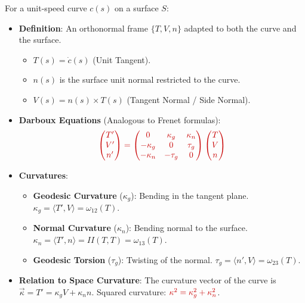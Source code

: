 \documentclass[a4paper,12pt]{article}
\newcommand{\key}[1]{\textcolor{keywordcolor}{\textbf{#1}}}
\newcommand{\formula}[1]{\textcolor{formulacolor}{#1}}
\begin{document}
For a unit-speed curve $c(s)$ on a surface $S$:
\begin{itemize}
    \item \key{Definition}: An orthonormal frame $\{T, V, n\}$ adapted to both the curve and the surface.
    \begin{itemize}
        \item $T(s) = \dot{c}(s)$ (Unit Tangent).
        \item $n(s)$ is the surface unit normal restricted to the curve.
        \item $V(s) = n(s) \times T(s)$ (Tangent Normal / Side Normal).
    \end{itemize}
    
    \item \key{Darboux Equations} (Analogous to Frenet formulas):
    \begin{equation}
        \formula{\begin{pmatrix} T' \\ V' \\ n' \end{pmatrix} = \begin{pmatrix} 0 & \kappa_g & \kappa_n \\ -\kappa_g & 0 & \tau_g \\ -\kappa_n & -\tau_g & 0 \end{pmatrix} \begin{pmatrix} T \\ V \\ n \end{pmatrix}}
    \end{equation}
    
    \item \key{Curvatures}:
    \begin{itemize}
        \item \textbf{Geodesic Curvature} ($\kappa_g$): Bending in the tangent plane. $\kappa_g = \langle T', V \rangle = \omega_{12}(T)$.
        \item \textbf{Normal Curvature} ($\kappa_n$): Bending normal to the surface. $\kappa_n = \langle T', n \rangle = II(T, T) = \omega_{13}(T)$.
        \item \textbf{Geodesic Torsion} ($\tau_g$): Twisting of the normal. $\tau_g = \langle n', V \rangle = \omega_{23}(T)$.
    \end{itemize}
    
    \item \key{Relation to Space Curvature}:
    The curvature vector of the curve is $\vec{\kappa} = T' = \kappa_g V + \kappa_n n$.
    Squared curvature: $\formula{\kappa^2 = \kappa_g^2 + \kappa_n^2}$.
\end{itemize}
\end{document}
